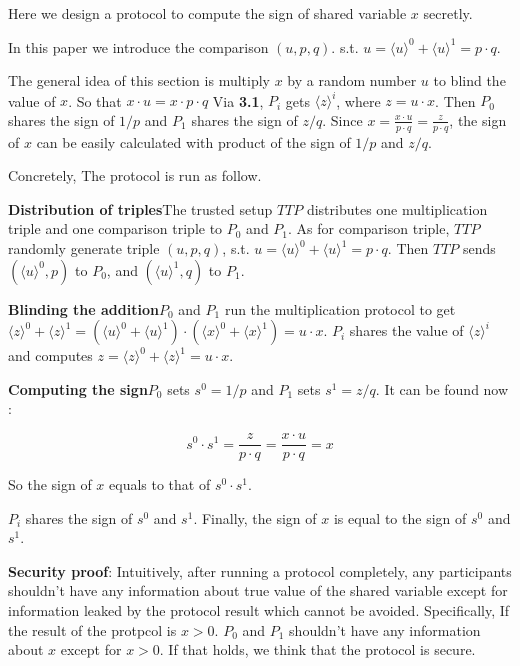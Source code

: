 \documentclass[11pt,twoside,a4paper]{article}
\begin{document}
Here we design a protocol to compute the sign of shared variable $x$ secretly.

In this paper we introduce the comparison  $(u,p,q)$. s.t. $u=\langle u\rangle ^{0}+\langle u\rangle ^{1}=p\cdot q$.

The general idea of this section is multiply $ x $ by a random number $ u $ to blind the value of $x$. So that $x \cdot u = x \cdot p\cdot q$
Via \textbf{3.1}, $P_{i}$ gets $\langle z\rangle ^{i}$, where $z= u\cdot x$.
Then $P_{0}$ shares the sign of $1/p$ and $P_{1}$ shares the sign of $z/q$.
Since $x  = \frac{x \cdot u}{p\cdot q}=\frac{z}{p\cdot q}$, the sign of $x$ can be easily calculated with product of the sign of $1/p$ and $z/q$.

Concretely, The protocol is run as follow. 

\textbf{Distribution of triples}The trusted setup $TTP$ distributes one multiplication triple and one comparison triple to $P_{0}$ and $P_{1}$.
As for comparison triple, $TTP$ randomly generate triple $(u,p,q)$, s.t. $u=\langle u\rangle ^{0}+\langle u\rangle ^{1}=p\cdot q$. 
Then $TTP$ sends $(\langle u\rangle ^{0}, p)$ to $P_{0}$, and $(\langle u\rangle ^{1}, q)$ to $P_{1}$.

\textbf{Blinding the addition}$P_{0}$ and $P_{1}$ run the multiplication protocol to get $\langle z\rangle ^{0}+\langle z\rangle ^{1}=(\langle u\rangle ^{0}+\langle u\rangle ^{1})\cdot(\langle x\rangle ^{0}+\langle x\rangle ^{1})=u\cdot x$. 
$P_{i}$ shares the value of $\langle z\rangle ^{i}$ and computes  $z=\langle z\rangle ^{0}+\langle z\rangle ^{1}=u\cdot x$. 

\textbf{Computing the sign}$P_{0}$ sets $s ^{0}=1/p$ and $P_{1}$ sets $s^{1}=z/q$. 
It can be found now :

	 $$s ^{0}\cdot  s ^{1} = \frac{z}{p\cdot q} 
	                     = \frac{x \cdot u}{p\cdot q}
					     = x$$

So the sign of $x$ equals to that of $s ^{0} \cdot s ^{1}$.

$P_{i}$ shares the sign of $ s^{0}$ and $ s ^{1}$. Finally, the sign of $x$ is equal to the sign of $ s^{0}$ and $ s^{1}$.


\textbf{Security proof}: Intuitively, after running a protocol completely, any participants shouldn't have any information about 
true value of the shared variable except for information leaked by the protocol result which cannot be avoided. 
Specifically, If the result of the protpcol is $x>0$. 
$P_{0}$ and $P_{1}$ shouldn't have any information about $x$ except for $x>0$.
If that holds, we think that the protocol is secure.  
\end{document}

